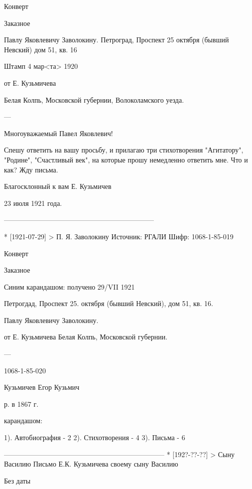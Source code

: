 \documentclass[]{memoir}
\begin{document}
Конверт

Заказное

Павлу Яковлевичу Заволокину.
Петроград, Проспект 25 октября (бывший Невский) дом 51, кв. 16

Штамп 4 мар<та> 1920

от Е. Кузьмичева

Белая Колпь, Московской губернии, Волоколамского уезда.

---

Многоуважаемый Павел Яковлевич!

Спешу ответить на вашу просьбу, и прилагаю три стихотворения "Агитатору", "Родине", "Счастливый век", на которые прошу немедленно ответить мне. Что и как? Жду письма.

Благосклонный к вам Е. Кузьмичев

23 июля 1921 года.

-----------------------------------------------------------------

* [1921-07-29] > П. Я. Заволокину 
Источник: РГАЛИ
Шифр: 1068-1-85-019

Конверт

Заказное

Синим карандашом: получено 29/VII 1921

Петрогдад, Проспект 25. октября (бывший Невский), дом 51, кв. 16.

Павлу Яковлевичу Заволокину.

от Е. Кузьмичева
Белая Колпь, Московской губернии.

---

1068-1-85-020

Кузьмичев Егор Кузьмич

р. в 1867 г.

карандашом: 

1). Автобиография - 2
2). Стихотворения - 4
3). Письма - 6 




---------------------------------------------------------------------
* [192?-??-??] > Сыну Василию
Письмо Е.К. Кузьмичева своему сыну Василию

Без даты
\end{document}
